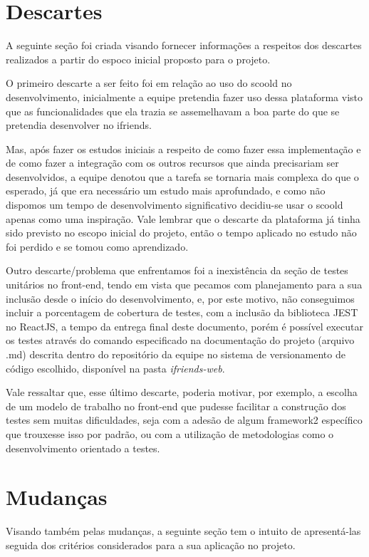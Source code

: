 \section{Descartes}
A seguinte seção foi criada visando fornecer informações a respeitos dos descartes realizados a partir do espoco inicial proposto para o projeto. 

O primeiro descarte a ser feito foi em relação ao uso do \gls{scoold} no desenvolvimento, inicialmente a equipe pretendia fazer uso dessa plataforma visto que as funcionalidades que ela trazia se assemelhavam a boa parte do que se pretendia desenvolver no \gls{ifriends}. 

Mas, após fazer os estudos iniciais a respeito de como fazer essa implementação e de como fazer a integração com os outros recursos que ainda precisariam ser desenvolvidos, a equipe denotou que a tarefa se tornaria mais complexa do que o esperado, já que era necessário um estudo mais aprofundado, e como não dispomos um tempo de desenvolvimento significativo decidiu-se usar o \gls{scoold} apenas como uma inspiração. Vale lembrar que o descarte da plataforma já tinha sido previsto no escopo inicial do projeto, então o tempo aplicado no estudo não foi perdido e se tomou como aprendizado.

Outro descarte/problema que enfrentamos foi a inexistência da seção de testes unitários no \gls{front-end}, tendo em vista que pecamos com planejamento para a sua inclusão desde o início do desenvolvimento, e, por este motivo, não conseguimos incluir a porcentagem de cobertura de testes, com a inclusão da biblioteca JEST no ReactJS, a tempo da entrega final deste documento, porém é possível executar os testes através do comando especificado na documentação do projeto (arquivo .md) descrita dentro do repositório da equipe no sistema de versionamento de código escolhido, disponível na pasta \textsl{ifriends-web}.

Vale ressaltar que, esse último descarte, poderia motivar, por exemplo, a escolha de um modelo de trabalho no \gls{front-end} que pudesse facilitar a construção dos testes sem muitas dificuldades, seja com a adesão de algum \gls{framework2} específico que trouxesse isso por padrão, ou com a utilização de metodologias como o desenvolvimento orientado a testes.

 
 \section{Mudanças}
Visando também pelas mudanças, a seguinte seção tem o intuito de apresentá-las seguida dos critérios considerados para a sua aplicação no projeto. 
 
